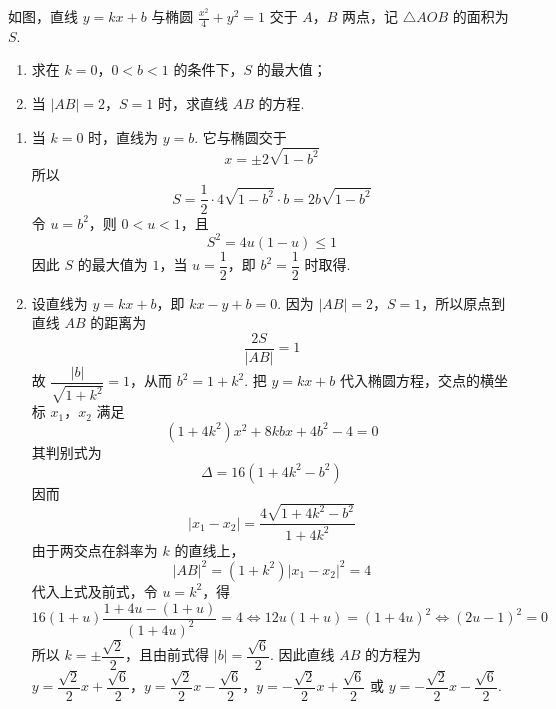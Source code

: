 \begin{problem}
如图，直线 \(y = kx + b\) 与椭圆 \(\frac{x^2}{4} + y^2 = 1\) 交于 \(A\)，\(B\) 两点，记 \(\triangle AOB\) 的面积为 \(S\).

\begin{enumerate}
\item 求在 \(k = 0\)，\(0 < b < 1\) 的条件下，\(S\) 的最大值；
\item 当 \(\left|AB\right| = 2\)，\(S = 1\) 时，求直线 \(AB\) 的方程.
\end{enumerate}


\begin{solution}
\begin{enumerate}
\item 当 \(k=0\) 时，直线为 \(y=b\). 它与椭圆交于
\[
x=\pm2\sqrt{1-b^2}
\]
所以
\[
S=\frac12\cdot4\sqrt{1-b^2}\cdot b=2b\sqrt{1-b^2}
\]
令 \(u=b^2\)，则 \(0<u<1\)，且
\[
S^2=4u(1-u)\leqslant1
\]
因此 \(S\) 的最大值为 \(1\)，当 \(u=\dfrac12\)，即 \(b^2=\dfrac12\) 时取得.
\item 设直线为 \(y=kx+b\)，即 \(kx-y+b=0\). 因为 \(\lvert AB\rvert=2\)，\(S=1\)，所以原点到直线 \(AB\) 的距离为
\[
\frac{2S}{\lvert AB\rvert}=1
\]
故 \(\dfrac{\lvert b\rvert}{\sqrt{1+k^2}}=1\)，从而 \(b^2=1+k^2\).
把 \(y=kx+b\) 代入椭圆方程，交点的横坐标 \(x_1\)，\(x_2\) 满足
\[
(1+4k^2)x^2+8kbx+4b^2-4=0
\]
其判别式为
\[
\Delta=16(1+4k^2-b^2)
\]
因而
\[
\lvert x_1-x_2\rvert
=\frac{4\sqrt{1+4k^2-b^2}}{1+4k^2}
\]
由于两交点在斜率为 \(k\) 的直线上，
\[
\lvert AB\rvert^2=(1+k^2)\lvert x_1-x_2\rvert^2=4
\]
代入上式及前式，令 \(u=k^2\)，得
\[
16(1+u)\frac{1+4u-(1+u)}{(1+4u)^2}=4
\Longleftrightarrow12u(1+u)=(1+4u)^2
\Longleftrightarrow(2u-1)^2=0
\]
所以 \(k=\pm\dfrac{\sqrt2}{2}\)，且由前式得 \(\lvert b\rvert=\dfrac{\sqrt6}{2}\). 因此直线 \(AB\) 的方程为 \(y=\dfrac{\sqrt2}{2}x+\dfrac{\sqrt6}{2}\)，\(y=\dfrac{\sqrt2}{2}x-\dfrac{\sqrt6}{2}\)，\(y=-\dfrac{\sqrt2}{2}x+\dfrac{\sqrt6}{2}\) 或 \(y=-\dfrac{\sqrt2}{2}x-\dfrac{\sqrt6}{2}\).
\end{enumerate}
\end{solution}
\end{problem}


